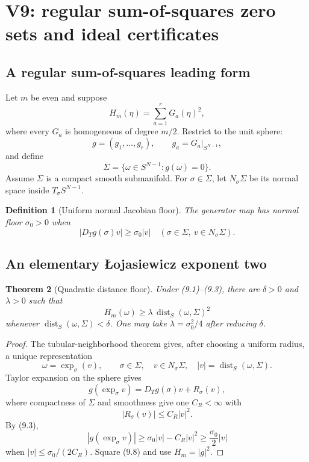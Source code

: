 \documentclass[11pt]{article}
\newtheorem{theorem}{Theorem}[section]
\newtheorem{definition}[theorem]{Definition}
\theoremstyle{remark}
\begin{document}
\section{V9: regular sum-of-squares zero sets and ideal certificates}
\label{sec:v17v9}

\subsection{A regular sum-of-squares leading form}

Let \(m\) be even and suppose
\[
 H_m(\eta)=\sum_{a=1}^rG_a(\eta)^2,                 \tag{9.1}
\]
where every \(G_a\) is homogeneous of degree \(m/2\).  Restrict to
the unit sphere:
\[
 g=(g_1,\ldots,g_r),\qquad g_a=G_a|_{S^{N-1}},
\]
and define
\[
 \Sigma=\{\omega\in S^{N-1}:g(\omega)=0\}.          \tag{9.2}
\]
Assume \(\Sigma\) is a compact smooth submanifold.  For
\(\sigma\in\Sigma\), let \(N_\sigma\Sigma\) be its normal space
inside \(T_\sigma S^{N-1}\).

\begin{definition}[Uniform normal Jacobian floor]
\label{def:v17v9-normal}
The generator map has normal floor \(\sigma_0>0\) when
\[
 |D_Tg(\sigma)v|
 \geq\sigma_0|v|
 \quad
 (\sigma\in\Sigma,\ v\in N_\sigma\Sigma).           \tag{9.3}
\]
\end{definition}

\subsection{An elementary Łojasiewicz exponent two}

\begin{theorem}[Quadratic distance floor]
\label{thm:v17v9-distance}
Under (9.1)--(9.3), there are \(\delta>0\) and
\(\lambda>0\) such that
\[
 H_m(\omega)
 \geq
 \lambda\,\operatorname{dist}_S(\omega,\Sigma)^2   \tag{9.4}
\]
whenever
\(\operatorname{dist}_S(\omega,\Sigma)<\delta\).
One may take \(\lambda=\sigma_0^2/4\) after reducing \(\delta\).
\end{theorem}

\begin{proof}
The tubular-neighborhood theorem gives, after choosing a uniform
radius, a unique representation
\[
 \omega=\exp_\sigma(v),\qquad
 \sigma\in\Sigma,\quad v\in N_\sigma\Sigma,\quad
 |v|=\operatorname{dist}_S(\omega,\Sigma).          \tag{9.5}
\]
Taylor expansion on the sphere gives
\[
 g(\exp_\sigma v)
 =
 D_Tg(\sigma)v+R_\sigma(v),                         \tag{9.6}
\]
where compactness of \(\Sigma\) and smoothness give one
\(C_R<\infty\) with
\[
 |R_\sigma(v)|\leq C_R|v|^2.                       \tag{9.7}
\]
By (9.3),
\[
 |g(\exp_\sigma v)|
 \geq\sigma_0|v|-C_R|v|^2
 \geq\frac{\sigma_0}{2}|v|                         \tag{9.8}
\]
when \(|v|\leq\sigma_0/(2C_R)\).  Square (9.8) and use
\(H_m=|g|^2\).
\end{proof}
\end{document}
